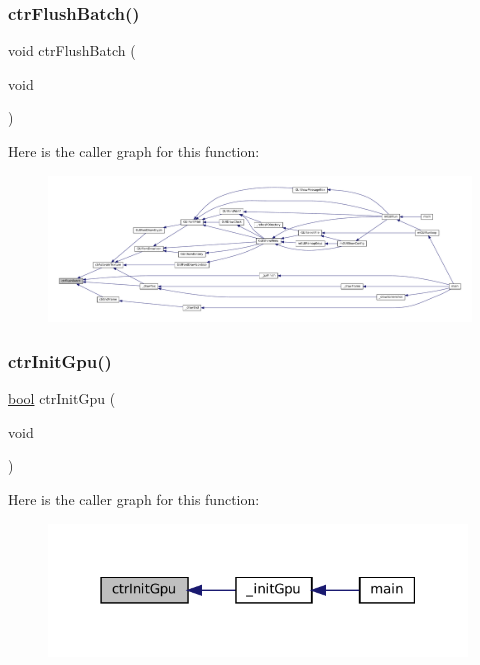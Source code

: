 \subsubsection{\texorpdfstring{ctr\+Flush\+Batch()}{ctrFlushBatch()}}
{\footnotesize\ttfamily void ctr\+Flush\+Batch (\begin{DoxyParamCaption}\item[{void}]{ }\end{DoxyParamCaption})}

Here is the caller graph for this function\+:
\nopagebreak
\begin{figure}[H]
\begin{center}
\leavevmode
\includegraphics[width=350pt]{ctr-gpu_8h_a7ab09886a00743bfac1d2b4aee447a34_icgraph}
\end{center}
\end{figure}
\mbox{\label{ctr-gpu_8h_a04a94149209a778c397be256b872da4a}} 
\subsubsection{\texorpdfstring{ctr\+Init\+Gpu()}{ctrInitGpu()}}
{\footnotesize\ttfamily \mbox{\hyperlink{libretro_8h_a4a26dcae73fb7e1528214a068aca317e}{bool}} ctr\+Init\+Gpu (\begin{DoxyParamCaption}\item[{void}]{ }\end{DoxyParamCaption})}

Here is the caller graph for this function\+:
\nopagebreak
\begin{figure}[H]
\begin{center}
\leavevmode
\includegraphics[width=315pt]{ctr-gpu_8h_a04a94149209a778c397be256b872da4a_icgraph}
\end{center}
\end{figure}
\mbox{\label{ctr-gpu_8h_a10edf7402a10780992aef77c359f99b4}} 
